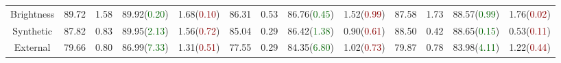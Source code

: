 \begin{table*}[ht]
{\begin{tabular}{c|cc|cc|cc|cc|cc|cc}
    Brightness & 89.72                   & 1.58                    & 89.92(\textcolor{darkgreen}{0.20}) & 1.68(\textcolor{darkred}{0.10})    & 86.31                   & 0.53                    & 86.76(\textcolor{darkgreen}{0.45}) & 1.52(\textcolor{darkred}{0.99})    & 87.58                   & 1.73                    & 88.57(\textcolor{darkgreen}{0.99}) & 1.76(\textcolor{darkred}{0.02})    \\
    Synthetic  & 87.82                   & 0.83                    & 89.95(\textcolor{darkgreen}{2.13}) & 1.56(\textcolor{darkred}{0.72})    & 85.04                   & 0.29                    & 86.42(\textcolor{darkgreen}{1.38}) & 0.90(\textcolor{darkred}{0.61})    & 88.50                    & 0.42                    & 88.65(\textcolor{darkgreen}{0.15}) & 0.53(\textcolor{darkred}{0.11})    \\
    External   & 79.66                   & 0.80                     & 86.99(\textcolor{darkgreen}{7.33}) & 1.31(\textcolor{darkred}{0.51})    & 77.55                   & 0.29                    & 84.35(\textcolor{darkgreen}{6.80}) & 1.02(\textcolor{darkred}{0.73})    & 79.87                   & 0.78                    & 83.98(\textcolor{darkgreen}{4.11}) & 1.22(\textcolor{darkred}{0.44})    \\ \bottomrule
    \end{tabular}}

\end{table*}